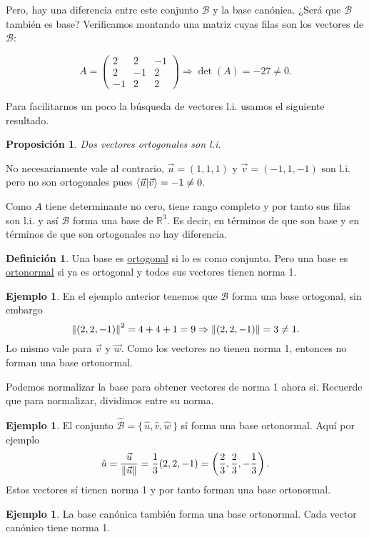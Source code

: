 \documentclass[12pt]{article}
\theoremstyle{plain}
\newtheorem{Prop}[Th]{Proposición}     %
\theoremstyle{definition}
\newtheorem*{Def}{Definición}       %
\newtheorem{Ex}[Th]{Ejemplo}           %
\theoremstyle{remark}
\newcommand{\bR}{\mathbb{R}}        %
\newcommand{\cB}{\mathcal{B}}       %
\renewcommand{\:}{\colon}           %
\newcommand{\un}[1]{\underline{#1}}
\renewcommand{\.}{\Cdot}                %
\newcommand{\threebythree}[9]{\begin{pmatrix} %
  #1 & #2 & #3 \\ #4 & #5 & #6 \\ #7 & #8 & #9 \end{pmatrix}}
\newcommand{\To}{\Rightarrow}
\newcommand{\set}[1]{\{\,#1\,\}}    %
\begin{document}
\begin{multicols}{2}
Pero, hay una diferencia entre este conjunto $\cB$ y la base canónica. ¿Será que $\cB$ también es base? Verificamos montando una matriz cuyas filas son los vectores de $\cB$:

$$A=\threebythree{2}{2}{-1}{2}{-1}{2}{-1}{2}{2}\To\det(A)=-27\neq 0.$$

Para facilitarnos un poco la búsqueda de vectores l.i. usamos el siguiente resultado.

\begin{Prop}
  Dos vectores ortogonales son l.i.
\end{Prop}

No necesariamente vale al contrario, $\vec{u}=(1,1,1)$ y $\vec{v}=(-1,1,-1)$ son l.i. pero no son ortogonales pues $\braket{\vec{u}}{\vec v}=-1\neq 0$.\par 
Como $A$ tiene determinante no cero, tiene rango completo y por tanto sus filas son l.i. y así $\cB$ forma una base de $\bR^3$. Es decir, en términos de que son base y en términos de que son ortogonales no hay diferencia.

\begin{Def}
  Una base es \un{ortogonal} si lo es como conjunto. Pero una base es \un{ortonormal} si ya es ortogonal y todos sus vectores tienen norma 1.
\end{Def}

\begin{Ex}
  En el ejemplo anterior tenemos que $\cB$ forma una base ortogonal, sin embargo
  $$\norm{(2,2,-1)}^2=4+4+1=9\To\norm{(2,2,-1)}=3\neq 1.$$
  Lo mismo vale para $\vec{v}$ y $\vec{w}$. Como los vectores no tienen norma 1, entonces no forman una base ortonormal.
\end{Ex}

Podemos normalizar la base para obtener vectores de norma 1 ahora si. Recuerde que para normalizar, dividimos entre su norma. 

\begin{Ex}
  El conjunto $\hat{\cB}=\set{\hat u,\hat v, \hat w}$ sí forma una base ortonormal. Aquí por ejemplo 
  $$\hat u=\frac{\vec u}{\norm{\vec u}}=\frac{1}{3}(2,2,-1)=\left(\frac23,\frac23,-\frac13\right).$$
  Estos vectores sí tienen norma 1 y por tanto forman una base ortonormal.
\end{Ex}

\begin{Ex}
  La base canónica también forma una base ortonormal. Cada vector canónico tiene norma 1.
\end{Ex}


\end{multicols}
\end{document}
